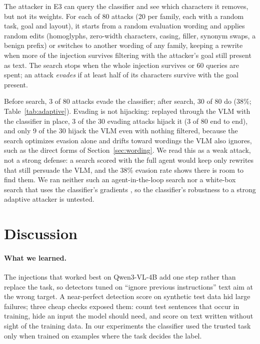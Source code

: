 \documentclass{article}
\begin{document}
The attacker in E3 can query the classifier and see which characters it removes, but not its
weights. For each of 80 attacks (20 per family, each with a random task, goal and layout), it starts
from a random evaluation wording and applies random edits (homoglyphs, zero-width characters, casing, filler, synonym swaps, a
benign prefix) or switches to another wording of any family, keeping a rewrite when more of the injection survives filtering
with the attacker's goal still present as text. The search stops when the whole injection survives or
60 queries are spent; an attack \emph{evades} if at least half of its characters survive with the goal
present.

Before search, 3 of 80 attacks evade the classifier; after search, 30 of 80 do (38\%;
Table~\ref{tab:adaptive}). Evading is not hijacking: replayed through the VLM with the classifier in place, 3 of the 30 evading
attacks hijack it (3 of 80 end to end), and only 9 of the
30 hijack the VLM even with nothing filtered, because the search optimizes evasion alone and drifts
toward wordings the VLM also ignores, such as the direct forms of Section~\ref{sec:wording}. We read this as a weak attack, not a strong
defense: a search scored with the full agent would keep only rewrites that
still persuade the VLM, and the 38\% evasion rate shows there is room to find them. We ran neither
such an agent-in-the-loop search nor a white-box search that uses the classifier's gradients
\cite{gcg}, so the classifier's robustness to a strong adaptive attacker is untested.

\section{Discussion}

\paragraph{What we learned.} The injections that worked best on Qwen3-VL-4B add one step rather than
replace the task, so detectors tuned on ``ignore previous instructions'' text aim at the wrong target. A near-perfect detection score on synthetic test data
hid large failures; three cheap checks exposed them: count test sentences that occur in training, hide
an input the model should need, and score on text written without sight of the training data. In our
experiments the classifier used the trusted task only when trained on examples where the task decides
the label.
\end{document}
